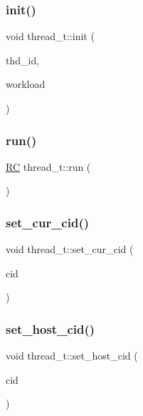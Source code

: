 \subsubsection{\texorpdfstring{init()}{init()}}
{\footnotesize\ttfamily void thread\+\_\+t\+::init (\begin{DoxyParamCaption}\item[{uint64\+\_\+t}]{thd\+\_\+id,  }\item[{\hyperlink{classworkload}{workload} $\ast$}]{workload }\end{DoxyParamCaption})}

\mbox{\label{classthread__t_ab5c82bb47e5886bee276b2b56daaa82f}} 
\subsubsection{\texorpdfstring{run()}{run()}}
{\footnotesize\ttfamily \hyperlink{global_8h_a78c49a674c810fdd03d20432f7be864a}{RC} thread\+\_\+t\+::run (\begin{DoxyParamCaption}{ }\end{DoxyParamCaption})}

\mbox{\label{classthread__t_acdfebeadd64bfffd24730cd41e8b5230}} 
\subsubsection{\texorpdfstring{set\+\_\+cur\+\_\+cid()}{set\_cur\_cid()}}
{\footnotesize\ttfamily void thread\+\_\+t\+::set\+\_\+cur\+\_\+cid (\begin{DoxyParamCaption}\item[{uint64\+\_\+t}]{cid }\end{DoxyParamCaption})}

\mbox{\label{classthread__t_affdd8c0f748856de17f3c869e1740346}} 
\subsubsection{\texorpdfstring{set\+\_\+host\+\_\+cid()}{set\_host\_cid()}}
{\footnotesize\ttfamily void thread\+\_\+t\+::set\+\_\+host\+\_\+cid (\begin{DoxyParamCaption}\item[{uint64\+\_\+t}]{cid }\end{DoxyParamCaption})}

